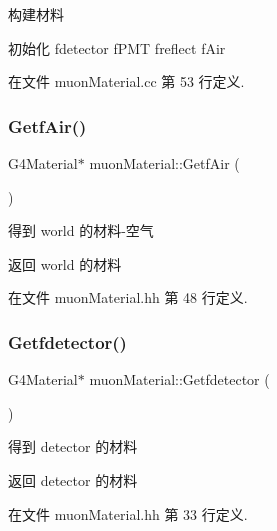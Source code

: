 构建材料 

初始化 fdetector f\+P\+MT freflect f\+Air 

在文件 muon\+Material.\+cc 第 53 行定义.

\mbox{\label{classmuonMaterial_a561de210ea339679872c522163990899}} 
\subsubsection{\texorpdfstring{Getf\+Air()}{GetfAir()}}
{\footnotesize\ttfamily G4\+Material$\ast$ muon\+Material\+::\+Getf\+Air (\begin{DoxyParamCaption}{ }\end{DoxyParamCaption})\hspace{0.3cm}{\ttfamily [inline]}}



得到 world 的材料-\/空气 

\begin{DoxyReturn}{返回}
world 的材料 
\end{DoxyReturn}


在文件 muon\+Material.\+hh 第 48 行定义.

\mbox{\label{classmuonMaterial_a8621980c58fd47d46f47728850341aa5}} 
\subsubsection{\texorpdfstring{Getfdetector()}{Getfdetector()}}
{\footnotesize\ttfamily G4\+Material$\ast$ muon\+Material\+::\+Getfdetector (\begin{DoxyParamCaption}{ }\end{DoxyParamCaption})\hspace{0.3cm}{\ttfamily [inline]}}



得到 detector 的材料 

\begin{DoxyReturn}{返回}
detector 的材料 
\end{DoxyReturn}


在文件 muon\+Material.\+hh 第 33 行定义.

\mbox{\label{classmuonMaterial_a198ba1027e11cf15bc0118533fff4356}} 
